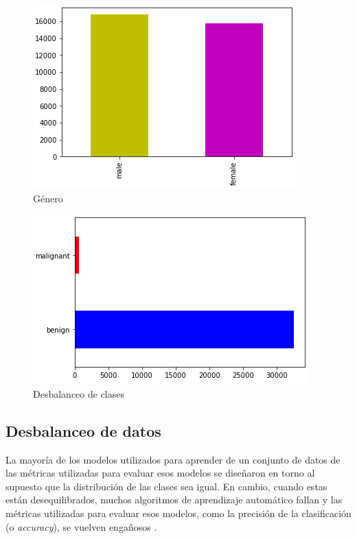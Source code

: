 \begin{figure}[htbp]
    \centering
    \textbf{}\par\medskip
    \includegraphics[scale=0.65]{3/figures/metadata/gender_count.PNG}
    \caption{Género}
    \label{gender_count}
\end{figure}

\begin{figure}[htbp]
    \centering
    \textbf{}\par\medskip
    \includegraphics[scale=0.65]{3/figures/metadata/imbalance_class.PNG}
    \caption{Desbalanceo de clases}
    \label{imbalance_class}
\end{figure}


\subsection{Desbalanceo de datos}

La mayoría de los modelos utilizados para aprender de un conjunto de datos de las métricas utilizadas para evaluar esos modelos se diseñaron en torno al supuesto que la distribución de las clases sea igual. En cambio, cuando estas están desequilibrados, muchos algoritmos de aprendizaje automático fallan y las métricas utilizadas para evaluar esos modelos, como la precisión de la clasificación (o \emph{accuracy}), se vuelven engañosos \cite{imbalanced-classification}.

